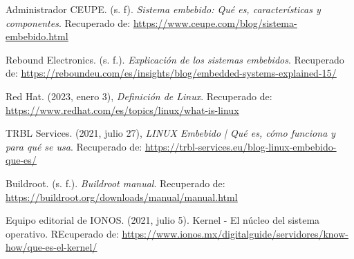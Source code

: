 \documentclass[12pt, letterpaper]{article}
\begin{document}
	\begin{biblio}
		\item Administrador CEUPE. (s. f). \textit{Sistema embebido: Qué es, características y componentes}. Recuperado de: \textcolor{blue}{\underline{\url{https://www.ceupe.com/blog/sistema-embebido.html}}}
		\item Rebound Electronics.  (s. f.). \textit{Explicación de los sistemas embebidos}. Recuperado de: \textcolor{blue}{\underline{\url{https://reboundeu.com/es/insights/blog/embedded-systems-explained-15/}}}
		\item Red Hat. (2023, enero 3), \textit{Definición de Linux}. Recuperado de: \newline \textcolor{blue}{\underline{\url{https://www.redhat.com/es/topics/linux/what-is-linux}}}
		\item TRBL Services. (2021, julio 27), \textit{LINUX Embebido | Qué es, cómo funciona y para qué se usa}. Recuperado de: \newline \textcolor{blue}{\underline{\url{https://trbl-services.eu/blog-linux-embebido-que-es/}}}
		\item Buildroot. (s. f.). \textit{Buildroot manual}. Recuperado de: \newline \textcolor{blue}{\underline{\url{https://buildroot.org/downloads/manual/manual.html}}}
		\item Equipo editorial de IONOS. (2021, julio 5). Kernel - El núcleo del sistema operativo. REcuperado de: \newline \textcolor{blue}{\underline{\url{https://www.ionos.mx/digitalguide/servidores/know-how/que-es-el-kernel/}}}
	\end{biblio}
\end{document}
